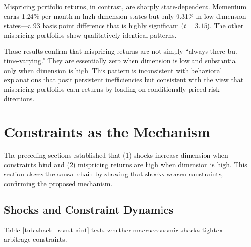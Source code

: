 \documentclass[12pt,letterpaper]{article}
\theoremstyle{plain}
\theoremstyle{definition}
\begin{document}
Mispricing portfolio returns, in contrast, are sharply state-dependent. Momentum earns 1.24\% per month in high-dimension states but only 0.31\% in low-dimension states---a 93 basis point difference that is highly significant ($t = 3.15$). The other mispricing portfolios show qualitatively identical patterns.

These results confirm that mispricing returns are not simply ``always there but time-varying.'' They are essentially zero when dimension is low and substantial only when dimension is high. This pattern is inconsistent with behavioral explanations that posit persistent inefficiencies but consistent with the view that mispricing portfolios earn returns by loading on conditionally-priced risk directions.


\section{Constraints as the Mechanism}\label{sec:mechanism}

The preceding sections established that (1) shocks increase dimension when constraints bind and (2) mispricing returns are high when dimension is high. This section closes the causal chain by showing that shocks worsen constraints, confirming the proposed mechanism.

\subsection{Shocks and Constraint Dynamics}\label{subsec:shock_constraint}

Table \ref{tab:shock_constraint} tests whether macroeconomic shocks tighten arbitrage constraints.
\end{document}
